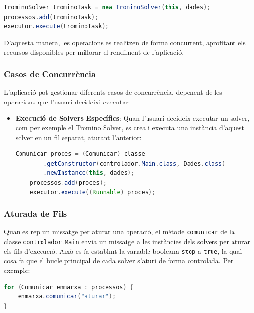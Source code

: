\documentclass{ieeetj}
\begin{document}
\begin{lstlisting}[language=Java, basicstyle=\ttfamily\small]
TrominoSolver trominoTask = new TrominoSolver(this, dades);
processos.add(trominoTask);
executor.execute(trominoTask);
\end{lstlisting}

D'aquesta manera, les operacions es realitzen de forma concurrent, aprofitant els recursos disponibles per millorar el rendiment de l'aplicació.

\subsubsection{Casos de Concurrència}
L'aplicació pot gestionar diferents casos de concurrència, depenent de les operacions que l'usuari decideixi executar:

\begin{itemize}
   
    \item \textbf{Execució de Solvers Específics}: Quan l'usuari decideix executar un solver, com per exemple el Tromino Solver, es crea i executa una instància d'aquest solver en un fil separat, aturant l'anterior:


    \begin{lstlisting}[language=Java, basicstyle=\ttfamily\small]
    Comunicar proces = (Comunicar) classe
        .getConstructor(controlador.Main.class, Dades.class)
        .newInstance(this, dades);
    processos.add(proces);
    executor.execute((Runnable) proces);
    \end{lstlisting}
\end{itemize}

\subsubsection{Aturada de Fils}
Quan es rep un missatge per aturar una operació, el mètode \texttt{comunicar} de la classe \texttt{controlador.Main} envia un missatge a les instàncies dels solvers per aturar els fils d'execució. Això es fa establint la variable booleana \texttt{stop} a \texttt{true}, la qual cosa fa que el bucle principal de cada solver s'aturi de forma controlada. Per exemple:

\begin{lstlisting}[language=Java, basicstyle=\ttfamily\small]
for (Comunicar enmarxa : processos) {
    enmarxa.comunicar("aturar");
}
\end{lstlisting}
\end{document}
